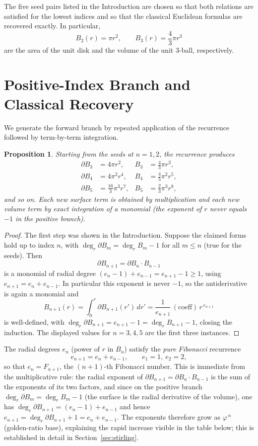 \documentclass[11pt,a4paper]{article}
\newtheorem{proposition}[theorem]{Proposition}
\theoremstyle{definition}
\begin{document}
The five seed pairs listed in the Introduction are chosen so that both relations are satisfied for the lowest indices and so that the classical Euclidean formulas are recovered exactly. In particular,
\[
B_2(r) = \pi r^2, \qquad B_3(r) = \frac43\pi r^3
\]
are the area of the unit disk and the volume of the unit 3-ball, respectively.

\section{Positive-Index Branch and Classical Recovery}

We generate the forward branch by repeated application of the recurrence followed by term-by-term integration.

\begin{proposition}\label{prop:forward}
Starting from the seeds at \(n=1,2\), the recurrence produces
\begin{align*}
\partial B_3 &= 4\pi r^2, & B_3 &= \tfrac43\pi r^3, \\
\partial B_4 &= 4\pi^2 r^4, & B_4 &= \tfrac45\pi^2 r^5, \\
\partial B_5 &= \tfrac{16}{3}\pi^3 r^7, & B_5 &= \tfrac23\pi^3 r^8,
\end{align*}
and so on. Each new surface term is obtained by multiplication and each new volume term by exact integration of a monomial (the exponent of \(r\) never equals \(-1\) in the positive branch).
\end{proposition}

\begin{proof}
The first step was shown in the Introduction. Suppose the claimed forms hold up to index \(n\), with \(\deg_r \partial B_m = \deg_r B_m - 1\) for all \(m\le n\) (true for the seeds). Then
\[
\partial B_{n+1} = \partial B_n \cdot B_{n-1}
\]
is a monomial of radial degree \((e_n-1)+e_{n-1} = e_{n+1}-1 \ge 1\), using \(e_{n+1}=e_n+e_{n-1}\). In particular this exponent is never \(-1\), so the antiderivative is again a monomial and
\[
B_{n+1}(r)=\int_0^r \partial B_{n+1}(r')\,dr' = \frac{1}{e_{n+1}}\,(\text{coeff})\,r^{\,e_{n+1}}
\]
is well-defined, with \(\deg_r \partial B_{n+1} = e_{n+1}-1 = \deg_r B_{n+1}-1\), closing the induction. The displayed values for \(n=3,4,5\) are the first three instances.
\end{proof}

The radial degrees \(e_n\) (power of \(r\) in \(B_n\)) satisfy the \emph{pure Fibonacci} recurrence
\[
e_{n+1} = e_n + e_{n-1}, \qquad e_1 = 1,\ e_2 = 2,
\]
so that \(e_n = F_{n+1}\), the \((n{+}1)\)-th Fibonacci number. This is immediate from the multiplicative rule: the radial exponent of \(\partial B_{n+1}=\partial B_n\cdot B_{n-1}\) is the sum of the exponents of its two factors, and since on the positive branch \(\deg_r \partial B_m = \deg_r B_m - 1\) (the surface is the radial derivative of the volume), one has \(\deg_r \partial B_{n+1} = (e_n-1) + e_{n-1}\) and hence \(e_{n+1} = \deg_r \partial B_{n+1} + 1 = e_n + e_{n-1}\). The exponents therefore grow as \(\varphi^{\,n}\) (golden-ratio base), explaining the rapid increase visible in the table below; this is established in detail in Section~\ref{sec:stirling}.
\end{document}
